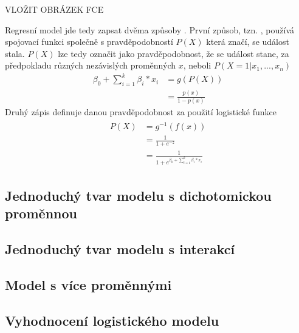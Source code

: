 VLOŽIT OBRÁZEK FCE

Regresní model jde tedy zapsat dvěma způsoby \cite{Kleinbaum2010}. První způsob, tzn. , používá spojovací funkci společně s pravděpodobností $P(X)$ která značí, se událost stala.
$P(X)$ lze tedy označit jako pravděpodobnost, že se událost stane, za předpokladu různých nezávislých proměnných $x$, neboli $P(X = 1 | x_1, ..., x_n)$
\begin{equation}
\begin{split}
    \beta_0 + \sum_{i=1}^k \beta_i*x_i &= g(P(X)) \\
                                      &= \frac{p(x)}{1 - p(x)}
\end{split}
\end{equation}
Druhý zápis definuje danou pravděpodobnost za použití logistické funkce
\begin{align}
\begin{split}
    P(X) &= g^{-1}(f(x)) \\
        &= \frac{1}{1+e^{-z}} \\
        &= \frac{1}{1+e^{\beta_0 + \sum_{i=1}^k \beta_i*x_i}}    
\end{split}
\end{align} 
\subsection{Jednoduchý tvar modelu s dichotomickou proměnnou}
\subsection{Jednoduchý tvar modelu s interakcí}
\subsection{Model s více proměnnými}
\subsection{Vyhodnocení logistického modelu}